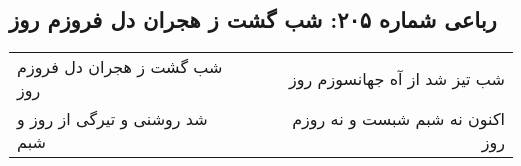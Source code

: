 \begin{center}
\section*{رباعی شماره ۲۰۵: شب گشت ز هجران دل فروزم روز}
\label{sec:sh205}
\begin{longtable}{l p{0.5cm} r}
شب گشت ز هجران دل فروزم روز
&&
شب تیز شد از آه جهانسوزم روز
\\
شد روشنی و تیرگی از روز و شبم
&&
اکنون نه شبم شبست و نه روزم روز
\\
\end{longtable}
\end{center}
